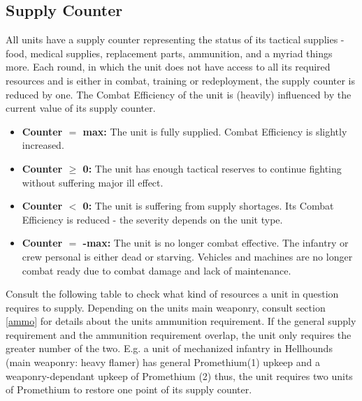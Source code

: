  \subsection{Supply Counter}
 All units have a supply counter representing the status of its tactical supplies - food, medical supplies, replacement parts, ammunition, and a myriad things more.
 Each round, in which the unit does not have access to all its required resources and is either in combat, training or redeployment, the supply counter is reduced by one. The Combat Efficiency of the unit is (heavily) influenced by the current value of its supply counter.
 \begin{itemize}
    \item \textbf{Counter $=$ max:} The unit is fully supplied. Combat Efficiency is slightly increased.
    \item \textbf{Counter $\ge$ 0:} The unit has enough tactical reserves to continue fighting without suffering major ill effect.
    \item \textbf{Counter $<$ 0:} The unit is suffering from supply shortages. Its Combat Efficiency is reduced - the severity depends on the unit type.
    \item \textbf{Counter $=$ -max:} The unit is no longer combat effective. The infantry or crew personal is either dead or starving. Vehicles and machines are no longer combat ready due to combat damage and lack of maintenance.
 \end{itemize}
 Consult the following table to check what kind of resources a unit in question requires to supply. Depending on the units main weaponry, consult section \ref{ammo} for details about the units ammunition requirement. If the general supply requirement and the ammunition requirement overlap, the unit only requires the greater number of the two. E.g. a unit of mechanized infantry in Hellhounds (main weaponry: heavy flamer) has general Promethium(1) upkeep and a weaponry-dependant upkeep of Promethium (2) thus, the unit requires two units of Promethium to restore one point of its supply counter.
